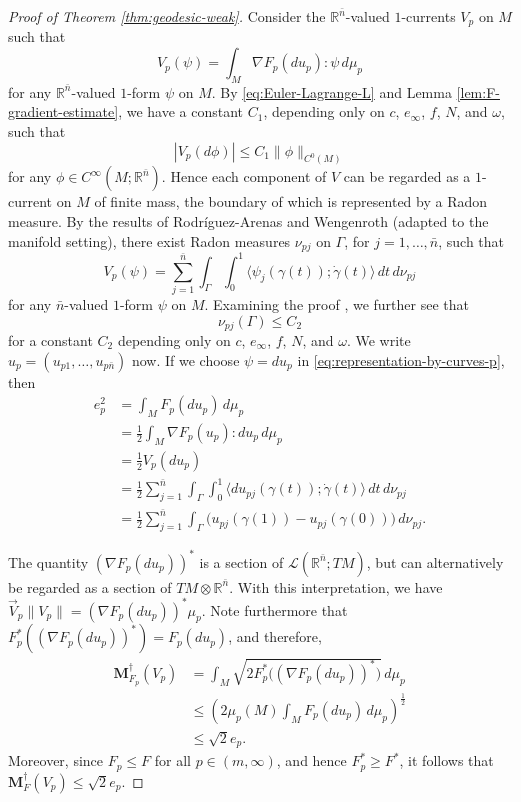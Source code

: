 \documentclass[10pt,a4paper]{amsart}
\newcommand{\R}{\mathbb{R}}
\newcommand{\M}{\mathbf{M}}
\newcommand{\ndim}{{\bar{n}}}
\newcommand{\Lin}{\mathcal{L}}
\newcommand{\pairing}[2]{\langle #1; #2 \rangle}
\begin{document}
\begin{proof}[Proof of Theorem \ref{thm:geodesic-weak}]
Consider the $\R^\ndim$-valued $1$-currents $V_p$ on $M$
such that
\[
V_p(\psi) = \int_M \nabla F_p(du_p) : \psi \, d\mu_p
\]
for any $\R^\ndim$-valued $1$-form $\psi$ on $M$. By \eqref{eq:Euler-Lagrange-L}
and Lemma \ref{lem:F-gradient-estimate}, we have a constant $C_1$, depending only on $c$, $e_\infty$, $f$, $N$, and $\omega$, such that
\[
|V_p(d\phi)| \le C_1 \|\phi\|_{C^0(M)}
\]
for any $\phi \in C^\infty(M; \R^\ndim)$. Hence each component of $V$ can be regarded as a
$1$-current on $M$ of finite mass, the boundary of which is represented by a Radon measure. By the results of Rodr\'iguez-Arenas and Wengenroth \cite{Rodriguez-Arenas-Wengenroth:24} (adapted to the manifold setting), there exist Radon measures $\nu_{pj}$ on $\Gamma$, for $j = 1, \dotsc, \ndim$, such that
\begin{equation} \label{eq:representation-by-curves-p}
V_p(\psi) = \sum_{j = 1}^\ndim \int_\Gamma \int_0^1 \pairing{\psi_j(\gamma(t))}{\dot{\gamma}(t)} \, dt \, d\nu_{pj}
\end{equation}
for any $\ndim$-valued $1$-form $\psi$ on $M$. Examining the proof \cite[Section 4]{Rodriguez-Arenas-Wengenroth:24},
we further see that
\[
\nu_{pj}(\Gamma) \le C_2
\]
for a constant $C_2$ depending only on $c$, $e_\infty$, $f$, $N$, and $\omega$.
We write $u_p = (u_{p1}, \dotsc, u_{p\ndim})$ now.
If we choose $\psi = du_p$ in \eqref{eq:representation-by-curves-p}, then
\begin{equation} \label{eq:representation-by-curves2}
\begin{split}
e_p^2 &= \int_M F_p(du_p) \, d\mu_p \\
& = \frac{1}{2} \int_M \nabla F_p(u_p) : du_p \, d\mu_p \\
& = \frac{1}{2} V_p(du_p) \\
& = \frac{1}{2} \sum_{j = 1}^\ndim \int_\Gamma \int_0^1 \pairing{du_{pj}(\gamma(t))}{\dot{\gamma}(t)} \, dt \, d\nu_{pj} \\
& = \frac{1}{2} \sum_{j = 1}^\ndim \int_\Gamma \bigl(u_{pj}(\gamma(1)) - u_{pj}(\gamma(0))\bigr) \, d\nu_{pj}.
\end{split}
\end{equation}

The quantity $(\nabla F_p(du_p))^*$ is a section of $\Lin(\R^\ndim; TM)$, but
can alternatively be regarded as a section of $TM \otimes \R^\ndim$.
With this interpretation, we have $\vec{V}_p \|V_p\| = (\nabla F_p(du_p))^* \mu_p$.
Note furthermore that $F_p^*((\nabla F_p(du_p))^*) = F_p(du_p)$, and therefore,
\[
\begin{split}
\M_{F_p}^\dagger(V_p) & = \int_M \sqrt{2F_p^*\bigl((\nabla F_p(du_p))^*\bigr)} \, d\mu_p \\
& \le \left(2\mu_p(M) \int_M F_p(du_p) \, d\mu_p\right)^{\frac{1}{2}} \\
& \le \sqrt{2} e_p.
\end{split}
\]
Moreover, since $F_p \le F$ for all $p \in (m, \infty)$, and hence $F_p^* \ge F^*$, it follows that $\M_F^\dagger(V_p) \le \sqrt{2} e_p$.


\end{proof}
\end{document}
